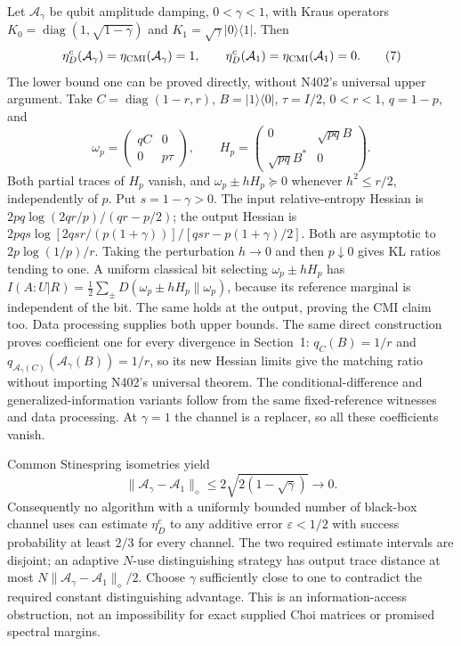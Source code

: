 \documentclass[10pt,a4paper]{article}
\begin{document}
Let $\mathcal A_\gamma$ be qubit amplitude damping, $0<\gamma<1$, with Kraus operators
$K_0=\operatorname{diag}(1,\sqrt{1-\gamma})$ and $K_1=\sqrt\gamma|0\rangle\langle1|$.
Then
\[
 \eta_D^c(\mathcal A_\gamma)=\eta_{\rm CMI}(\mathcal A_\gamma)=1,
 \qquad \eta_D^c(\mathcal A_1)=\eta_{\rm CMI}(\mathcal A_1)=0. \tag{7}
\]
The lower bound one can be proved directly, without N402's universal upper argument. Take $C=\operatorname{diag}(1-r,r)$, $B=|1\rangle\langle0|$, $\tau=I/2$, $0<r<1$, $q=1-p$, and
\[
 \omega_p=\begin{pmatrix}qC&0\\0&p\tau\end{pmatrix},\qquad
 H_p=\begin{pmatrix}0&\sqrt{pq}B\\\sqrt{pq}B^*&0\end{pmatrix}.
\]
Both partial traces of $H_p$ vanish, and $\omega_p\pm hH_p\succeq0$ whenever $h^2\le r/2$, independently of $p$. Put $s=1-\gamma>0$. The input relative-entropy Hessian is
$2pq\log(2qr/p)/(qr-p/2)$; the output Hessian is
$2pqs\log[2qsr/(p(1+\gamma))]/[qsr-p(1+\gamma)/2]$.
Both are asymptotic to $2p\log(1/p)/r$. Taking the perturbation $h\to0$ and then $p\downarrow0$ gives KL ratios tending to one. A uniform classical bit selecting $\omega_p\pm hH_p$ has $I(A:U|R)=\frac12\sum_\pm D(\omega_p\pm hH_p\|\omega_p)$, because its reference marginal is independent of the bit. The same holds at the output, proving the CMI claim too. Data processing supplies both upper bounds. The same direct construction proves coefficient one for every divergence in Section~1: $q_C(B)=1/r$ and $q_{\mathcal A_\gamma(C)}(\mathcal A_\gamma(B))=1/r$, so its new Hessian limits give the matching ratio without importing N402's universal theorem. The conditional-difference and generalized-information variants follow from the same fixed-reference witnesses and data processing. At $\gamma=1$ the channel is a replacer, so all these coefficients vanish.

Common Stinespring isometries yield
\[
 \|\mathcal A_\gamma-\mathcal A_1\|_\diamond
 \le2\sqrt{2(1-\sqrt\gamma)}\longrightarrow0. \tag{8}
\]
Consequently no algorithm with a uniformly bounded number of black-box channel uses can estimate $\eta_D^c$ to any additive error $\varepsilon<1/2$ with success probability at least $2/3$ for every channel. The two required estimate intervals are disjoint; an adaptive $N$-use distinguishing strategy has output trace distance at most $N\|\mathcal A_\gamma-\mathcal A_1\|_\diamond/2$. Choose $\gamma$ sufficiently close to one to contradict the required constant distinguishing advantage. This is an information-access obstruction, not an impossibility for exact supplied Choi matrices or promised spectral margins.
\end{document}
